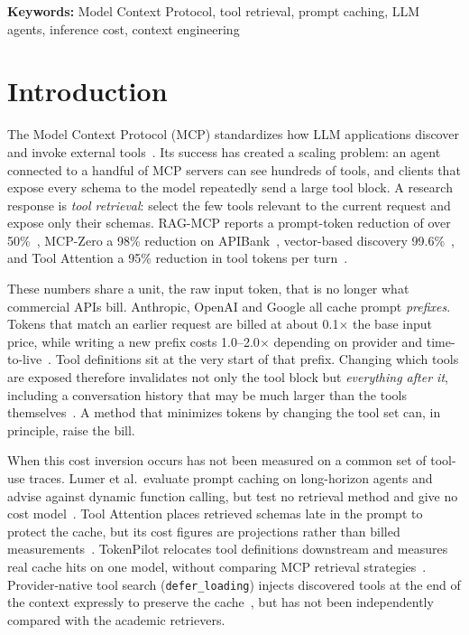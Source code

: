 \documentclass[11pt]{article}
\begin{document}
\noindent\textbf{Keywords:} Model Context Protocol, tool retrieval, prompt caching, LLM agents, inference cost, context engineering

\section{Introduction}
The Model Context Protocol (MCP) standardizes how LLM applications discover and invoke external tools~\cite{mcp}. Its success has created a scaling problem: an agent connected to a handful of MCP servers can see hundreds of tools, and clients that expose every schema to the model repeatedly send a large tool block. A research response is \emph{tool retrieval}: select the few tools relevant to the current request and expose only their schemas. RAG-MCP reports a prompt-token reduction of over 50\%~\cite{ragmcp}, MCP-Zero a 98\% reduction on APIBank~\cite{mcpzero}, vector-based discovery 99.6\%~\cite{semdisc}, and Tool Attention a 95\% reduction in tool tokens per turn~\cite{toolattention}.

These numbers share a unit, the raw input token, that is no longer what commercial APIs bill. Anthropic, OpenAI and Google all cache prompt \emph{prefixes}. Tokens that match an earlier request are billed at about 0.1$\times$ the base input price, while writing a new prefix costs 1.0--2.0$\times$ depending on provider and time-to-live~\cite{anth_cache,oai_cache,gemini_price}. Tool definitions sit at the very start of that prefix. Changing which tools are exposed therefore invalidates not only the tool block but \emph{everything after it}, including a conversation history that may be much larger than the tools themselves~\cite{anth_cache}. A method that minimizes tokens by changing the tool set can, in principle, raise the bill.

When this cost inversion occurs has not been measured on a common set of tool-use traces. Lumer et al.\ evaluate prompt caching on long-horizon agents and advise against dynamic function calling, but test no retrieval method and give no cost model~\cite{dontbreak}. Tool Attention places retrieved schemas late in the prompt to protect the cache, but its cost figures are projections rather than billed measurements~\cite{toolattention}. TokenPilot relocates tool definitions downstream and measures real cache hits on one model, without comparing MCP retrieval strategies~\cite{tokenpilot}. Provider-native tool search (\texttt{defer\_loading}) injects discovered tools at the end of the context expressly to preserve the cache~\cite{anth_toolsearch,oai_toolsearch}, but has not been independently compared with the academic retrievers.
\end{document}
